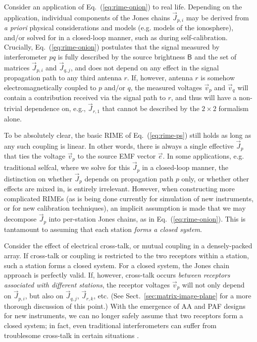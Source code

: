 \documentclass[]{aa}
\newcommand{\jones}[2]{\vec {#1}_{#2}}
\newcommand{\coh}[2]{\mathsf{{#1}}_{{#2}}}
\begin{document}
Consider an application of Eq.~(\ref{eq:rime-onion}) to real life. Depending on the application, individual components of the Jones chains $\jones{J}{p,i}$ may be derived from {\em a priori} physical considerations and models (e.g. models of the ionosphere), and/or solved for in a closed-loop manner, such as during self-calibration. Crucially, Eq.~(\ref{eq:rime-onion}) postulates that the signal measured by interferometer $pq$ is fully described by the source brightness $\coh{B}{}$ and the set of matrices $\jones{J}{p,i}$ and $\jones{J}{q,j}$, and does not depend on any effect in the signal propagation path to any third antenna $r$. If, however, antenna $r$ is somehow electromagnetically coupled to $p$ and/or $q$, the measured voltages $\vec v_p$ and $\vec v_q$ will contain a contribution received via the signal path to $r$, and thus will have a non-trivial dependence on, e.g., $\jones{J}{r,1}$ that cannot be described by the $2\times2$ formalism alone.

To be absolutely clear, the basic RIME of Eq.~(\ref{eq:rime-ps}) still holds as long as any such coupling is linear. In other words, there is always a single effective $\jones{J}{p}$ that ties the voltage $\vec v_p$ to the source EMF vector $\vec e$. In some applications, e.g. traditional selfcal, where we solve for this $\jones{J}{p}$ in a closed-loop manner, the distinction on whether $\jones{J}{p}$ depends on propagation path $p$ only, or whether other effects are mixed in, is entirely irrelevant. However, when constructing more complicated RIMEs (as is being done currently for simulation of new instruments, or for new calibration techniques), an implicit assumption is made that we may decompose $\jones{J}{p}$ into per-station Jones chains, as in Eq.~(\ref{eq:rime-onion}). This is tantamount to assuming that each station \emph{forms a closed system}.

Consider the effect of electrical cross-talk, or mutual coupling in a densely-packed array. If cross-talk or coupling is restricted to
the two receptors within a station, such a station forms a closed system. For a closed system, the Jones chain approach is perfectly valid. If, however, cross-talk occurs \emph{between receptors associated with different stations}, the receptor voltages $\vec{v}_{p}$ will
not only depend on $\jones{J}{p,i}$, but also on $\jones{J}{q,j}$, $\jones{J}{r,k}$, etc. (See Sect.~\ref{sec:matrix-image-plane} for a more thorough discussion of this point.) With the emergence of AA and PAF designs for new instruments, we can no longer safely assume that two receptors form a closed system; in fact, even traditional interferometers can suffer from troublesome cross-talk in certain situations \citep{ATCA-xtalk}.
\end{document}

